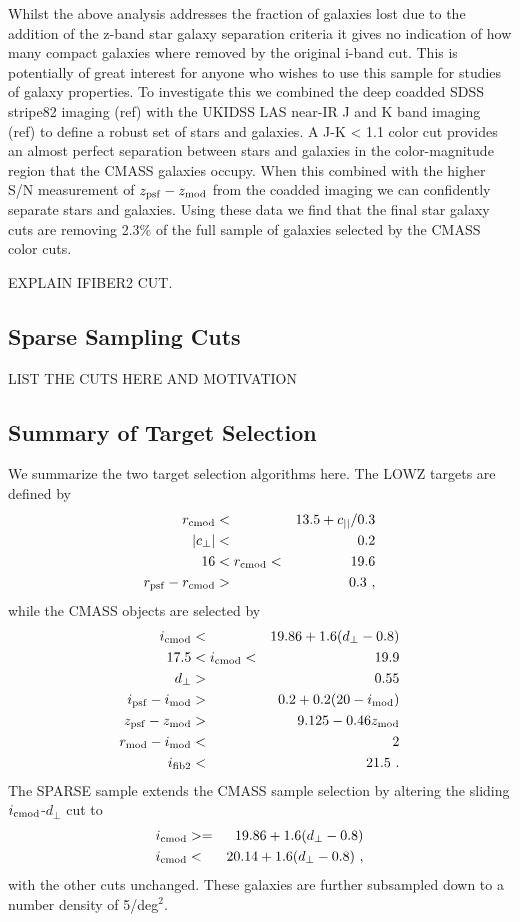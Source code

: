 \documentclass[preprint]{aastex}
\newcommand{\cpp}{c_{\perp}}
\newcommand{\cll}{c_{||}}
\newcommand{\dpp}{d_{\perp}}
\newcommand{\rmod}{r_{\rm mod}}
\newcommand{\imod}{i_{\rm mod}}
\newcommand{\rcmod}{r_{\rm cmod}}
\newcommand{\icmod}{i_{\rm cmod}}
\newcommand{\ipsf}{i_{\rm psf}}
\newcommand{\zpsf}{z_{\rm psf}}
\newcommand{\zmod}{z_{\rm mod}}
\newcommand{\rpsf}{r_{\rm psf}}
\newcommand{\ifib}{i_{\rm fib2}}
\begin{document}
Whilst the above analysis addresses the fraction of galaxies lost due to the
addition of the z-band star galaxy separation criteria it gives no indication of
how many compact galaxies where removed by the original i-band cut. This is
potentially of great interest for anyone who wishes to use this sample for
studies of galaxy properties. To investigate this we combined the deep coadded
SDSS stripe82 imaging (ref) with the UKIDSS LAS near-IR J and K band imaging
(ref) to define a robust set of stars and galaxies. A J-K < 1.1 color cut
provides an almost perfect separation between stars and galaxies in the
color-magnitude region that the CMASS galaxies occupy. When this combined with
the higher S/N measurement of $\zpsf-\zmod$ from the coadded imaging we can
confidently separate stars and galaxies. Using these data we find that the final
star galaxy cuts are removing 2.3\% of the full sample of galaxies selected by
the CMASS color cuts.


EXPLAIN IFIBER2 CUT.

\subsection{Sparse Sampling Cuts}

LIST THE CUTS HERE AND MOTIVATION

\subsection{Summary of Target Selection}

We summarize the two target selection algorithms here. The LOWZ targets are
defined by 
\begin{eqnarray}
\rcmod  & < & 13.5 + \cll/0.3 \\ 
|\cpp| & < & 0.2 \\
16 & < \rcmod < & 19.6 \\
\rpsf - \rcmod & > & 0.3 \,\,,
\end{eqnarray}
while the CMASS objects are selected by 
\begin{eqnarray}
\icmod & < & 19.86 + 1.6(\dpp - 0.8) \\
17.5 & < \icmod <  & 19.9 \\
\dpp & > & 0.55 \\
\ipsf - \imod & > & 0.2 + 0.2(20 - \imod) \\
\zpsf - \zmod & > & 9.125 - 0.46 \zmod \\
\rmod - \imod & < & 2 \\
\ifib & < & 21.5 \,\,.
\end{eqnarray}
The SPARSE sample extends the CMASS sample selection by altering the sliding
$\icmod$-$\dpp$ cut to 
\begin{eqnarray}
\icmod & >= & 19.86 + 1.6(\dpp - 0.8) \\
\icmod & < & 20.14 + 1.6(\dpp - 0.8) \,\,, 
\end{eqnarray}
with the other cuts unchanged. These galaxies are further subsampled down to a
number density of 5/deg$^2$. 
\end{document}
